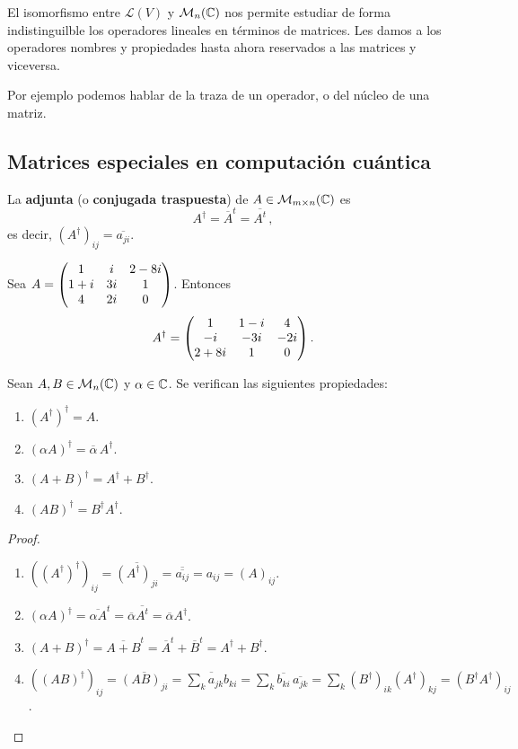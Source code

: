 El isomorfismo entre $\mathcal{L}(V)$ y $\mathcal{M}_n(\mathbb{C})$ nos permite estudiar de forma indistinguilble los operadores lineales en términos de matrices. Les damos a los operadores nombres y propiedades hasta ahora reservados a las matrices y viceversa.

Por ejemplo podemos hablar de la traza de un operador, o del núcleo de una matriz.

\subsection{Matrices especiales en computación cuántica}

\begin{defi}[Adjunta]
  La \textbf{adjunta} (o \textbf{conjugada traspuesta}) de $A\in\mathcal{M}_{m\times n}(\mathbb{C})$ es
  \[
    A^\dagger = \overline{A}^{t} = \overline{A^{t}}\,,
  \]
  es decir, $(A^\dagger)_{ij}=\overline{a_{ji}}$.
\end{defi}
\begin{eje}
  Sea $A=\mqty(1 & i & 2 - 8i\\ 1+i & 3i & 1\\ 4 & 2i & 0)$. Entonces
  \[
    A^\dagger = \mqty(1 & 1-i & 4\\ -i & -3i & -2i\\ 2+8i & 1 & 0)\,.
  \]
\end{eje}
\begin{prop}
  Sean $A,B\in\mathcal{M}_n(\mathbb{C})$ y $\alpha\in\mathbb{C}$. Se verifican las siguientes propiedades:
  \begin{enumerate}
    \item $(A^\dagger)^\dagger = A$.
    \item $(\alpha A)^\dagger = \overline{\alpha}\,A^\dagger$.
    \item $(A+B)^\dagger = A^\dagger+B^\dagger$.
    \item $(AB)^\dagger = B^\dagger A^\dagger$.
  \end{enumerate}
\end{prop}
\begin{proof}
  \begin{enumerate}
    \item
          $((A^\dagger)^\dagger)_{ij} = \overline{(A^\dagger)_{ji}} = \overline{\overline{a_{ij}}} = a_{ij} = (A)_{ij}$.
    \item
          $(\alpha A)^\dagger = \overline{\alpha A}^t = \overline{\alpha} \overline{A^t} = \overline{\alpha} A^\dagger$.
    \item
          $(A+B)^\dagger = \overline{A+B}^t = \overline{A}^t + \overline{B}^t = A^\dagger + B^\dagger$.
    \item
          $((AB)^\dagger)_{ij} = \overline{(AB)_{ji}} = \overline{\sum_k a_{jk}b_{ki}} = \sum_k\overline{b_{ki}}\,\overline{a_{jk}} = \sum_k(B^\dagger)_{ik}(A^\dagger)_{kj} = (B^\dagger A^\dagger)_{ij}$.
  \end{enumerate}
\end{proof}

